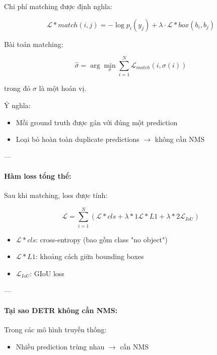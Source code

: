 Chi phí matching được định nghĩa:

\begin{equation}
	\mathcal{L}*{match}(i, j) = - \log p_i(y_j) + \lambda \cdot \mathcal{L}*{box}(b_i, b_j)
\end{equation}

Bài toán matching:

\begin{equation}
	\hat{\sigma} = \arg\min_{\sigma} \sum_{i=1}^{N} \mathcal{L}_{match}(i, \sigma(i))
\end{equation}

trong đó $\sigma$ là một hoán vị.

Ý nghĩa:
\begin{itemize}
	\item Mỗi ground truth được gán với đúng một prediction
	\item Loại bỏ hoàn toàn duplicate predictions $\rightarrow$ không cần NMS
\end{itemize}

---

\paragraph{Hàm loss tổng thể:}

Sau khi matching, loss được tính:

\begin{equation}
	\mathcal{L} = \sum_{i=1}^{N} \left( \mathcal{L}*{cls} + \lambda*{1} \mathcal{L}*{L1} + \lambda*{2} \mathcal{L}_{IoU} \right)
\end{equation}

\begin{itemize}
	\item $\mathcal{L}*{cls}$: cross-entropy (bao gồm class "no object")
	\item $\mathcal{L}*{L1}$: khoảng cách giữa bounding boxes
	\item $\mathcal{L}_{IoU}$: GIoU loss
\end{itemize}

---

\paragraph{Tại sao DETR không cần NMS:}

Trong các mô hình truyền thống:
\begin{itemize}
	\item Nhiều prediction trùng nhau $\rightarrow$ cần NMS
\end{itemize}

